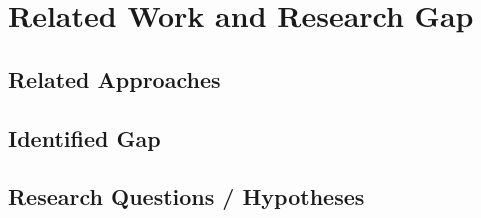 \documentclass[../main.tex]{subfiles}
\begin{document}
\chapter{Related Work and Research Gap}
\label{ch:related-work}


\section{Related Approaches}
\label{sec:related-approaches}

\section{Identified Gap}
\label{sec:related-gap}

\section{Research Questions / Hypotheses}
\label{sec:related-questions}
\end{document}
